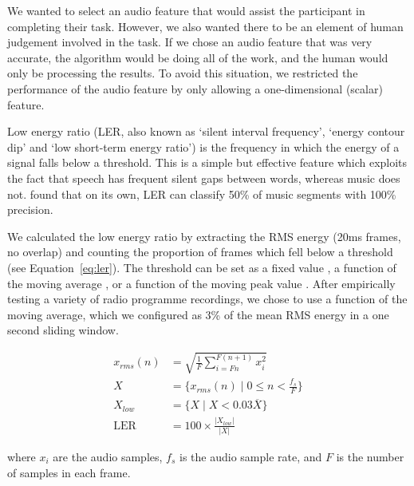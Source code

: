 We wanted to select an audio feature that would assist the participant in completing their task.  However, we also
wanted there to be an element of human judgement involved in the task. If we chose an audio feature that was very
accurate, the algorithm would be doing all of the work, and the human would only be processing the results.  To avoid
this situation, we restricted the performance of the audio feature by only allowing a one-dimensional (scalar) feature.

Low energy ratio (LER, also known as `silent interval frequency', `energy contour dip' and `low short-term energy
ratio') is the frequency in which the energy of a signal falls below a threshold. This is a simple but effective
feature which exploits the fact that speech has frequent silent gaps between words, whereas music does not.
\citet{Panagiotakis2005} found that on its own, LER can classify 50\% of music segments with 100\% precision.

We calculated the low energy ratio by extracting the RMS energy (20ms frames, no overlap) and counting the proportion
of frames which fell below a threshold (see Equation~\ref{eq:ler}).  The threshold can be set as a fixed value
\citep{Liang2005,Panagiotakis2005}, a function of the moving average \citep{Ericsson2009}, or a function of the moving
peak value \citep{Saunders1996}.  After empirically testing a variety of radio programme recordings, we chose to use a
function of the moving average, which we configured as 3\% of the mean RMS energy in a one second sliding window.

\begin{align}
  x_{rms}(n) &= \sqrt{\frac{1}{F} \displaystyle\sum\limits_{i=Fn}^{F(n+1)} x_i^2}\\
  X &= \{x_{rms}(n) \mid 0 \leq n < \frac{f_s}{F}\}\\
  X_{low} &= \{X \mid X < 0.03\overline{X}\}\\
  \text{LER} &= 100 \times \frac{|X_{low}|}{|X|}\label{eq:ler}
\end{align}

where $x_i$ are the audio samples, $f_s$ is the audio sample rate, and $F$ is the number of samples in each frame.



